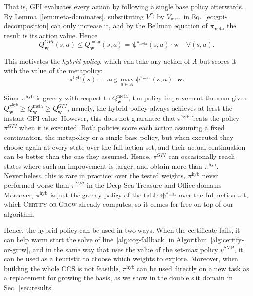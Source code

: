 \documentclass[11pt]{article}
\newcommand{\vpsi}{\bm{\psi}}      %
\begin{document}
That is, GPI evaluates every action by following a single base policy afterwards. By Lemma~\ref{lem:meta-dominates}, substituting $V^{\pi_j}$ by $V_{\mathrm{meta}}$ in Eq.~\eqref{eq:gpi-decomposition} can only increase it, and by the Bellman equation of $\pi_{\mathrm{meta}}$ the result is its action value. Hence
\begin{equation}\label{eq:gpi-bound}
    Q^{GPI}_{\mathbf{w}}(s,a) \leq Q^{\mathrm{meta}}_{\mathbf{w}}(s,a) = \vpsi^{\pi_{\mathrm{meta}}}(s,a) \cdot \mathbf{w} \quad \forall (s,a).
\end{equation}

This motivates the \textit{hybrid policy}, which can take any action of $A$ but scores it with the value of the metapolicy:
\begin{equation}\label{eq:hyb}
    \pi^{\mathrm{hyb}}(s) = \arg\max_{a \in A} \vpsi^{\pi_{\mathrm{meta}}}(s,a) \cdot \mathbf{w}.
\end{equation}

Since $\pi^{\mathrm{hyb}}$ is greedy with respect to $Q^{\mathrm{meta}}_{\mathbf{w}}$, the policy improvement theorem gives $Q^{\pi^{\mathrm{hyb}}}_{\mathbf{w}} \geq Q^{\mathrm{meta}}_{\mathbf{w}} \geq Q^{GPI}_{\mathbf{w}}$, namely, the hybrid policy always achieves at least the instant GPI value. However, this does not guarantee that $\pi^{\mathrm{hyb}}$ beats the policy $\pi^{GPI}$ when it is executed. Both policies score each action assuming a fixed continuation, the metapolicy or a single base policy, but when executed they choose again at every state over the full action set, and their actual continuation can be better than the one they assumed. Hence, $\pi^{GPI}$ can occasionally reach states where such an improvement is larger, and obtain more than $\pi^{\mathrm{hyb}}$. Nevertheless, this is rare in practice: over the tested weights, $\pi^{\mathrm{hyb}}$ never performed worse than $\pi^{GPI}$ in the Deep Sea Treasure and Office domains
Moreover, $\pi^{\mathrm{hyb}}$ is just the greedy policy of the table $\vpsi^{\pi_{\mathrm{meta}}}$ over the full action set, which \textsc{Certify-or-Grow} already computes, so it comes for free on top of our algorithm.

Hence, the hybrid policy can be used in two ways. When the certificate fails, it can help warm start the solve of line~\ref{alg:cog-fallback} in Algorithm~\ref{alg:certify-or-grow}, and in the same way that \cite{zahavy_discovering_2021} uses the value of the set-max policy $v^{\mathrm{SMP}}$, it can be used as a heuristic to choose which weights to explore. Moreover, when building the whole CCS is not feasible, $\pi^{\mathrm{hyb}}$ can be used directly on a new task as a replacement for growing the basis, as we show in the double slit domain in Sec.~\ref{sec:results}.
\end{document}
